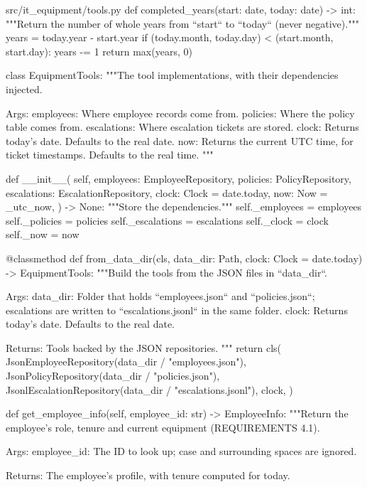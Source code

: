 \documentclass[11pt,letterpaper]{article}
\renewcommand{\_}{\textunderscore\allowbreak}
\begin{document}
\begin{codebox}{src/it_equipment/tools.py}
def completed_years(start: date, today: date) -> int:
    """Return the number of whole years from ``start`` to ``today`` (never negative)."""
    years = today.year - start.year
    if (today.month, today.day) < (start.month, start.day):
        years -= 1
    return max(years, 0)


class EquipmentTools:
    """The tool implementations, with their dependencies injected.

    Args:
        employees: Where employee records come from.
        policies: Where the policy table comes from.
        escalations: Where escalation tickets are stored.
        clock: Returns today's date. Defaults to the real date.
        now: Returns the current UTC time, for ticket timestamps. Defaults to the real time.
    """

    def __init__(
        self,
        employees: EmployeeRepository,
        policies: PolicyRepository,
        escalations: EscalationRepository,
        clock: Clock = date.today,
        now: Now = _utc_now,
    ) -> None:
        """Store the dependencies."""
        self._employees = employees
        self._policies = policies
        self._escalations = escalations
        self._clock = clock
        self._now = now

    @classmethod
    def from_data_dir(cls, data_dir: Path, clock: Clock = date.today) -> EquipmentTools:
        """Build the tools from the JSON files in ``data_dir``.

        Args:
            data_dir: Folder that holds ``employees.json`` and ``policies.json``; escalations
                are written to ``escalations.jsonl`` in the same folder.
            clock: Returns today's date. Defaults to the real date.

        Returns:
            Tools backed by the JSON repositories.
        """
        return cls(
            JsonEmployeeRepository(data_dir / "employees.json"),
            JsonPolicyRepository(data_dir / "policies.json"),
            JsonlEscalationRepository(data_dir / "escalations.jsonl"),
            clock,
        )

    def get_employee_info(self, employee_id: str) -> EmployeeInfo:
        """Return the employee's role, tenure and current equipment (REQUIREMENTS 4.1).

        Args:
            employee_id: The ID to look up; case and surrounding spaces are ignored.

        Returns:
            The employee's profile, with tenure computed for today.


\end{codebox}
\end{document}
